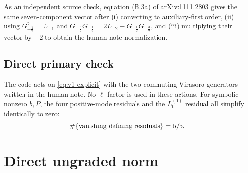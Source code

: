 \documentclass[11pt]{article}
\newcommand{\half}{\tfrac12}
\begin{document}
As an independent source check, equation (B.3a) of
\href{https://arxiv.org/pdf/1111.2803}{arXiv:1111.2803} gives the same
seven-component vector after (i) converting to auxiliary-first order,
(ii) using \(G_{-\half}^2=L_{-1}\) and
\(G_{-\frac32}G_{-\half}=2L_{-2}-G_{-\half}G_{-\frac32}\), and
(iii) multiplying their vector by \(-2\) to obtain the human-note
normalization.

\subsection{Direct primary check}

The code acts on \eqref{eq:v1-explicit} with the two commuting Virasoro
generators written in the human note.  No \(\ell\)-factor is used in these
actions.  For symbolic nonzero \(b,P\), the four positive-mode residuals and
the \(L_0^{(1)}\) residual all simplify identically to zero:
\begin{equation}
 \#\{\hbox{vanishing defining residuals}\}=5/5.
 \label{eq:primary-result}
\end{equation}

\section{Direct ungraded norm}
\end{document}
